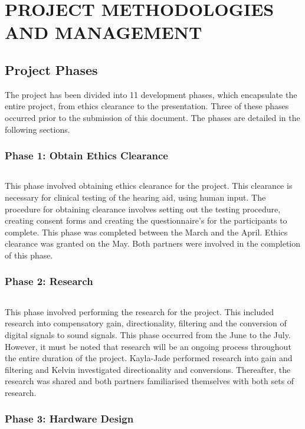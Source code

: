 \documentclass[10pt,twocolumn]{witseiepaper}
\begin{document}
\section{PROJECT METHODOLOGIES AND MANAGEMENT}
\subsection{Project Phases}
The project has been divided into 11 development phases, which encapsulate the entire project, from ethics clearance to the presentation. Three of these phases occurred prior to the submission of this document. The phases are detailed in the following sections.

\subsubsection*{Phase 1: Obtain Ethics Clearance} $    $

This phase involved obtaining ethics clearance for the project. This clearance is necessary for clinical testing of the hearing aid, using human input. The procedure for obtaining clearance involves setting out the testing procedure, creating consent forms and creating the questionnaire's for the participants to complete. This phase was completed between the  March and the  April. Ethics clearance was granted on the  May. Both partners were involved in the completion of this phase.

\subsubsection*{Phase 2: Research} $    $

This phase involved performing the research for the project. This included research into compensatory gain, directionality, filtering and the conversion of digital signals to sound signals. This phase occurred from the  June to the  July. However, it must be noted that research will be an ongoing process throughout the entire duration of the project. Kayla-Jade performed research into gain and filtering and Kelvin investigated directionality and conversions. Thereafter, the research was shared and both partners familiarised themselves with both sets of research.

\subsubsection*{Phase 3: Hardware Design } $    $
\end{document}
